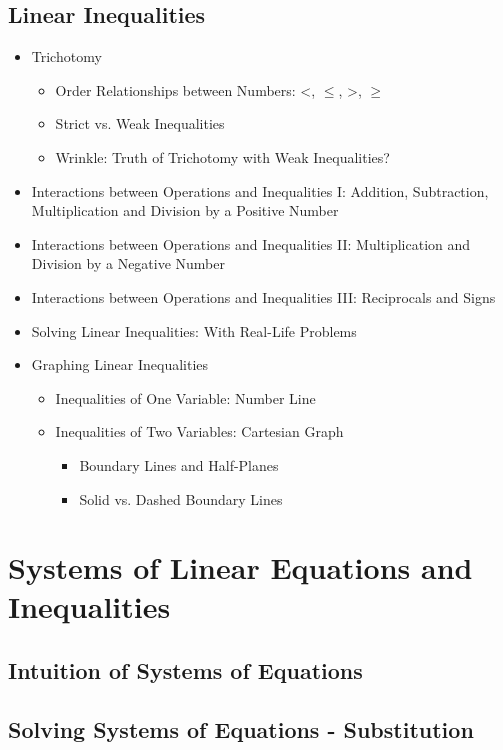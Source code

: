 \documentclass[11pt]{article}
\begin{document}
\subsection{Linear Inequalities}
\begin{itemize}
    \item Trichotomy
    \begin{itemize}
        \item Order Relationships between Numbers: <, \(\leq\), >, \(\geq\)
        \item Strict vs. Weak Inequalities
        \item Wrinkle: Truth of Trichotomy with Weak Inequalities?
    \end{itemize}
    \item Interactions between Operations and Inequalities I: Addition, Subtraction, Multiplication and Division by a Positive Number
    \item Interactions between Operations and Inequalities II: Multiplication and Division by a Negative Number
    \item Interactions between Operations and Inequalities III: Reciprocals and Signs
    \item Solving Linear Inequalities: With Real-Life Problems
    \item Graphing Linear Inequalities
    \begin{itemize}
        \item Inequalities of One Variable: Number Line
        \item Inequalities of Two Variables: Cartesian Graph
        \begin{itemize}
            \item Boundary Lines and Half-Planes
            \item Solid vs. Dashed Boundary Lines
        \end{itemize}
    \end{itemize}
\end{itemize}

\setcounter{section}{6}
\section{Systems of Linear Equations and Inequalities}
\subsection{Intuition of Systems of Equations}
\subsection{Solving Systems of Equations - Substitution}
\end{document}

